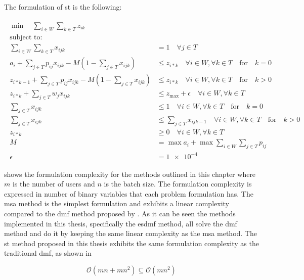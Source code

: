 The formulation of \gls{st} is the following:

\begin{align}
	\begin{split}
	    \min \quad \sum_{i \in W} \sum_{k \in T} z_{ik}\\
	    \text{subject to:} \\
	    \sum_{i \in W} \sum_{k \in T} x_{ijk} &= 1 \quad \forall j \in T\\
	    a_i + \sum_{j \in T} p_{ij} x_{ijk} - M(1 - \sum_{j \in T} x_{ijk}) &\leq z_{i*k} \quad \forall i \in W, \forall k \in T \quad \text{for} \quad k=0\\
	    z_{i*k-1} + \sum_{j \in T} p_{ij} x_{ijk} - M(1 - \sum_{j \in T} x_{ijk}) &\leq z_{i*k} \quad \forall i \in W, \forall k \in T \quad \text{for} \quad k>0\\
	    z_{i*k}+ \sum_{j \in T} w_j x_{ijk} &\leq z_{\text{max}} + \epsilon \quad \forall i \in W, \forall k \in T\\
	    \sum_{j \in T} x_{ijk} &\leq 1 \quad \forall i \in W, \forall k \in T \quad \text{for} \quad k=0\\
	    \sum_{j \in T} x_{ijk} &\leq \sum_{j \in T} x_{ijk-1} \quad \forall i \in W, \forall k \in T \quad \text{for} \quad k>0\\
	    z_{i*k} &\geq 0 \quad \forall i \in W, \forall k \in T\\
	    M &= \max a_i + \max \sum_{i \in W} \sum_{j \in T} p_{ij}\\
	    \epsilon &= \num{1e-4}
	\end{split}
\end{align}

 shows the formulation complexity for the methods outlined in this chapter where $m$ is the number of users and $n$ is the batch size. The formulation complexity is expressed in number of binary variables that each problem formulation has. The \gls{msa} method is the simplest formulation and exhibits a linear complexity compared to the \gls{dmf} method proposed by \citet{Zeng2005}. As it can be seen the methods implemented in this thesis, specifically the \gls{esdmf} method, all solve the \gls{dmf} method and do it by keeping the same linear complexity as the \gls{msa} method. The \gls{st} method proposed in this thesis exhibits the same formulation complexity as the traditional \gls{dmf}, as shown in 

\begin{equation}
\label{eq:st_complexity}
	\mathcal{O}(mn+mn^2) \subseteq \mathcal{O}(mn^2)
\end{equation}
 
